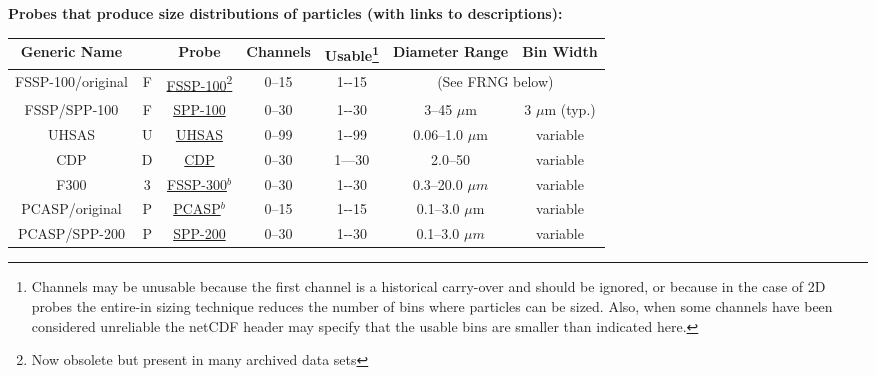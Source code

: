 \begin{center}
\noindent\begin{minipage}[t]{1\columnwidth}%
\begin{center}
\textbf{Probes that produce size distributions of particles (with
links to descriptions):\label{TableOfProbes}}
\par\end{center}
\begin{center}
\begin{tabular}{|c|c|c|c|c|c|c|}
\hline 
\textbf{\small{}Generic Name} &  & \textbf{\small{}Probe} & \textbf{\small{}Channels} & \textbf{\small{}Usable}\footnote{Channels may be unusable because the first channel is a historical
carry-over and should be ignored, or because in the case of 2D probes
the entire-in sizing technique reduces the number of bins where particles
can be sized. Also, when some channels have been considered unreliable
the netCDF header may specify that the usable bins are smaller than
indicated here.} & \textbf{\small{}Diameter Range} & \textbf{\small{}Bin Width}\tabularnewline
\hline 
\hline 
{\small{}FSSP-100/original} & {\small{}F} & {\small{}\href{http://www.eol.ucar.edu/raf/Bulletins/B24/fssp100.html}{FSSP-100}}\footnote{Now obsolete but present in many archived data sets} & {\small{}0--15} & {\small{}1-{}-15} & \multicolumn{2}{c|}{{\small{}(See FRNG below)}}\tabularnewline
\hline 
FSSP/SPP-100 & F & \href{http://www.eol.ucar.edu/instruments/forward-scattering-spectrometer-probe-model-100}{SPP-100} & 0--30 & 1-{}-30 & \multicolumn{1}{c||}{3--45 $\mu$m } & 3 $\mu$m (typ.)\tabularnewline
\hline 
UHSAS & U & \href{https://www.eol.ucar.edu/instruments/ultra-high-sensitivity-aerosol-spectrometer}{UHSAS} & 0--99 & 1-{}-99 & \multicolumn{1}{c||}{0.06--1.0 $\mu$m} & variable\tabularnewline
\hline 
CDP & D & \href{https://www.eol.ucar.edu/instruments/cloud-droplet-probe}{CDP} & 0--30 & 1---30 & \multicolumn{1}{c||}{2.0--50} & variable\tabularnewline
\hline 
{\small{}F300} & {\small{}3} & {\small{}\href{https://www.eol.ucar.edu/instruments/forward-scattering-spectrometer-probe-model-300}{FSSP-300}$^{b}$} & {\small{}0--30} & {\small{}1-{}-30} & {\small{}0.3--20.0 $\mu m$} & {\small{}variable}\tabularnewline
\hline 
PCASP/original & P & \href{http://www.eol.ucar.edu/raf/Bulletins/B24/pcasp100.html}{PCASP}$^{b}$ & 0--15 & 1-{}-15 & 0.1--3.0 $\mu$m & variable\tabularnewline
\hline 
PCASP/SPP-200 & P & {\small{}\href{https://www.eol.ucar.edu/instruments/signal-processing-package-200-passive-cavity-aerosol-spectrometer-probe}{SPP-200}} & {\small{}0--30} & {\small{}1-{}-30} & {\small{}0.1--3.0 $\mu m$} & {\small{}variable}\tabularnewline

\end{tabular}
\end{center}
\end{minipage}
\end{center}
